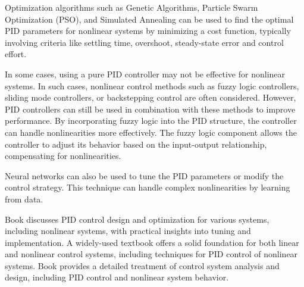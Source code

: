 \documentclass[preprint,12pt]{elsarticle}
\begin{document}
Optimization algorithms such as Genetic Algorithms, Particle Swarm Optimization (PSO), and Simulated Annealing can be used to find the optimal PID parameters for nonlinear systems by minimizing a cost function, typically involving criteria like settling time, overshoot, steady-state error and control effort.

In some cases, using a pure PID controller may not be effective for nonlinear systems. In such cases, nonlinear control methods such as fuzzy logic controllers, sliding mode controllers, or backstepping control are often considered. However, PID controllers can still be used in combination with these methods to improve performance. By incorporating fuzzy logic into the PID structure, the controller can handle nonlinearities more effectively. The fuzzy logic component allows the controller to adjust its behavior based on the input-output relationship, compensating for nonlinearities.

Neural networks can also be used to tune the PID parameters or modify the control strategy. This technique can handle complex nonlinearities by learning from data.
 
Book \cite{astrom2006advanced} discusses PID control design and optimization for various systems, including nonlinear systems, with practical insights into tuning and implementation.  A widely-used textbook \cite{nise2011control} offers a solid foundation for both linear and nonlinear control systems, including techniques for PID control of nonlinear systems. Book \cite{ogata2010modern} provides a detailed treatment of control system analysis and design, including PID control and nonlinear system behavior. 
\end{document}
